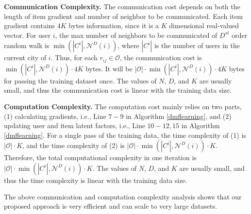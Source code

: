 \textbf{Communication Complexity. }
The communication cost depends on both the length of item gradient and number of neighbor to be communicated. 
Each item gradient contains $4K$ bytes information, since it is a $K$ dimensional real-valued vector. 
For user $i$, the max number of neighbors to be communicated of $D^{st}$ order random walk is $\min(|C^i|, \mathcal{N}^D(i))$, where $|C^i|$ is the number of users in the current city of $i$. 
Thus, for each $r_{ij} \in \mathcal{O}$, the communication cost is $\min(|C^i|, \mathcal{N}^D(i)) \cdot 4K$ bytes. 
It will be $|\mathcal{O}| \cdot \min(|C^i|, \mathcal{N}^D(i)) \cdot 4K$ bytes for passing the training dataset once. 
The values of $N$, $D$, and $K$ are usually small, and thus the communication cost is linear with the training data size. 

\textbf{Computation Complexity. }
The computation cost mainly relies on two parts, (1) calculating gradients, i.e., Line $7-9$ in Algorithm \ref{dmflearning}, and (2) updating user and item latent factors, i.e., Line $10-12,15$ in Algorithm \ref{dmflearning}. 
For a single pass of the training data, the time complexity of (1) is $|\mathcal{O}| \cdot K$, and the time complexity of (2) is $|\mathcal{O}| \cdot \min(|C^i|, \mathcal{N}^D(i)) \cdot K$. 
Therefore, the total computational complexity in one iteration is $|\mathcal{O}| \cdot \min(|C^i|, \mathcal{N}^D(i)) \cdot K$. 
The values of $N$, $D$, and $K$ are usually small, and thus the time complexity is linear with the training data size. 

The above communication and computation complexity analysis shows that our proposed approach is very efficient and can scale to very large datasets. 

